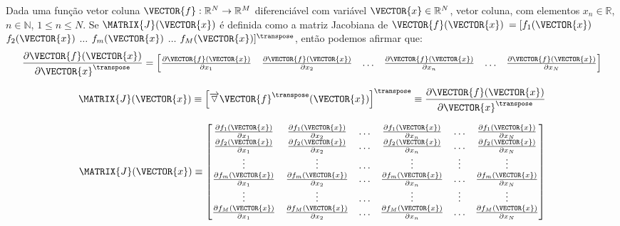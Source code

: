 \begin{proposition}\label{def:jacobian}
 Dada uma função vetor coluna $\VECTOR{f}:\mathbb{R}^{N}\rightarrow \mathbb{R}^{M}$ 
diferenciável com variável $\VECTOR{x} \in \mathbb{R}^{N}$, vetor coluna,
com elementos $x_n\in \mathbb{R}$, $n\in \mathbb{N}$, $1 \leq n \leq N$.
 Se $\MATRIX{J}(\VECTOR{x})$ é definida como a matriz Jacobiana \cite[pp. 130]{zhang2017matrix} \cite{Jacobian}  de 
 $\VECTOR{f}(\VECTOR{x})$
$=[f_1(\VECTOR{x})$ $f_2(\VECTOR{x})$ $\dots$ $f_m(\VECTOR{x})$ $\dots$ $f_M(\VECTOR{x})]^{\transpose}$, 
então podemos afirmar que: 
 \begin{equation}
   \frac{\partial \VECTOR{f}(\VECTOR{x})}{\partial \VECTOR{x}^{\transpose} }=
\left[
\begin{matrix}
\frac{\partial \VECTOR{f}(\VECTOR{x}) }{\partial x_{1}}&
\frac{\partial \VECTOR{f}(\VECTOR{x}) }{\partial x_{2}}&
\hdots&
\frac{\partial \VECTOR{f}(\VECTOR{x}) }{\partial x_{n}}&
\hdots&
\frac{\partial \VECTOR{f}(\VECTOR{x}) }{\partial x_{N}}
\end{matrix}
\right]
 \end{equation}

\begin{equation}
\MATRIX{J}(\VECTOR{x})\equiv
\left[\overrightarrow{\triangledown} \VECTOR{f}^{\transpose}(\VECTOR{x})\right]^{\transpose} \equiv 
\frac{\partial \VECTOR{f}(\VECTOR{x})}{\partial \VECTOR{x}^{\transpose} }
\end{equation}

  \begin{equation}
  \MATRIX{J}(\VECTOR{x})\equiv 
\left[
\begin{matrix}
\frac{\partial f_1(\VECTOR{x}) }{\partial x_{1}}&
\frac{\partial f_1(\VECTOR{x}) }{\partial x_{2}}&
\hdots&
\frac{\partial f_1(\VECTOR{x}) }{\partial x_{n}}&
\hdots&
\frac{\partial f_1(\VECTOR{x}) }{\partial x_{N}}\\
\frac{\partial f_2(\VECTOR{x}) }{\partial x_{1}}&
\frac{\partial f_2(\VECTOR{x}) }{\partial x_{2}}&
\hdots&
\frac{\partial f_2(\VECTOR{x}) }{\partial x_{n}}&
\hdots&
\frac{\partial f_2(\VECTOR{x}) }{\partial x_{N}}\\
\vdots&
\vdots&
\hdots&
\vdots&
\vdots&
\vdots\\
\frac{\partial f_m(\VECTOR{x}) }{\partial x_{1}}&
\frac{\partial f_m(\VECTOR{x}) }{\partial x_{2}}&
\hdots&
\frac{\partial f_m(\VECTOR{x}) }{\partial x_{n}}&
\hdots&
\frac{\partial f_m(\VECTOR{x}) }{\partial x_{N}}\\
\vdots&
\vdots&
\hdots&
\vdots&
\vdots&
\vdots\\
\frac{\partial f_M(\VECTOR{x}) }{\partial x_{1}}&
\frac{\partial f_M(\VECTOR{x}) }{\partial x_{2}}&
\hdots&
\frac{\partial f_M(\VECTOR{x}) }{\partial x_{n}}&
\hdots&
\frac{\partial f_M(\VECTOR{x}) }{\partial x_{N}}\\
\end{matrix}
\right]
 \end{equation}
\end{proposition}

